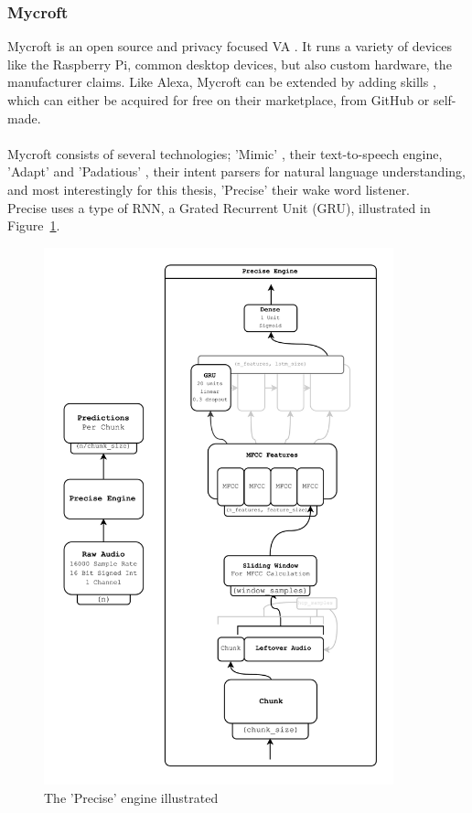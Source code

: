 \subsubsection{Mycroft}

Mycroft is an open source \cite{mycroft_gh} and privacy focused VA \cite{mycroft}.
It runs a variety of devices like the Raspberry Pi, common desktop devices, but also custom hardware, the manufacturer claims.
Like Alexa, Mycroft can be extended by adding skills \cite{mycroft_skills}, which can either be acquired for free on their marketplace,
from GitHub or self-made.\\\\
Mycroft consists of several technologies; 'Mimic' \cite{mycroft_mimic3}, their text-to-speech engine, 'Adapt' \cite{mycroft_adapt} and 'Padatious' \cite{mycroft_padatious},
their intent parsers for natural language understanding, and most interestingly for this thesis, 'Precise' \cite{mycroft_precise} their wake word listener.\\
Precise uses a type of RNN, a Grated Recurrent Unit (GRU), illustrated in Figure~\ref{fig:precise_gru}.


\begin{figure}[htb]
    \centering
    \includegraphics[width=0.9\textwidth]{figures/precise_engine.PNG}
    \caption[Illustration: The 'Precise' engine \cite{mycroft_precise}]{The 'Precise' engine illustrated}
    \label{fig:precise_gru}
\end{figure}
